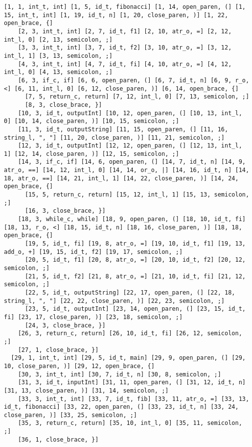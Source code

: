 \documentclass[12pt, a4paper]{memoir}
\begin{document}
\begin{lstlisting}[style=result]
  [1, 1, int_t, int] [1, 5, id_t, fibonacci] [1, 14, open_paren, (] [1, 15, int_t, int] [1, 19, id_t, n] [1, 20, close_paren, )] [1, 22, open_brace, {]
    [2, 3, int_t, int] [2, 7, id_t, f1] [2, 10, atr_o, =] [2, 12, int_l, 0] [2, 13, semicolon, ;]
    [3, 3, int_t, int] [3, 7, id_t, f2] [3, 10, atr_o, =] [3, 12, int_l, 1] [3, 13, semicolon, ;]
    [4, 3, int_t, int] [4, 7, id_t, fi] [4, 10, atr_o, =] [4, 12, int_l, 0] [4, 13, semicolon, ;]
    [6, 3, if_c, if] [6, 6, open_paren, (] [6, 7, id_t, n] [6, 9, r_o, <] [6, 11, int_l, 0] [6, 12, close_paren, )] [6, 14, open_brace, {]
      [7, 5, return_c, return] [7, 12, int_l, 0] [7, 13, semicolon, ;]
      [8, 3, close_brace, }]
    [10, 3, id_t, outputInt] [10, 12, open_paren, (] [10, 13, int_l, 0] [10, 14, close_paren, )] [10, 15, semicolon, ;]
    [11, 3, id_t, outputString] [11, 15, open_paren, (] [11, 16, string_l, ", "] [11, 20, close_paren, )] [11, 21, semicolon, ;]
    [12, 3, id_t, outputInt] [12, 12, open_paren, (] [12, 13, int_l, 1] [12, 14, close_paren, )] [12, 15, semicolon, ;]
    [14, 3, if_c, if] [14, 6, open_paren, (] [14, 7, id_t, n] [14, 9, atr_o, ==] [14, 12, int_l, 0] [14, 14, or_o, |] [14, 16, id_t, n] [14, 18, atr_o, ==] [14, 21, int_l, 1] [14, 22, close_paren, )] [14, 24, open_brace, {]
      [15, 5, return_c, return] [15, 12, int_l, 1] [15, 13, semicolon, ;]
      [16, 3, close_brace, }]
    [18, 3, while_c, while] [18, 9, open_paren, (] [18, 10, id_t, fi] [18, 13, r_o, <] [18, 15, id_t, n] [18, 16, close_paren, )] [18, 18, open_brace, {]
      [19, 5, id_t, fi] [19, 8, atr_o, =] [19, 10, id_t, f1] [19, 13, add_o, +] [19, 15, id_t, f2] [19, 17, semicolon, ;]
      [20, 5, id_t, f1] [20, 8, atr_o, =] [20, 10, id_t, f2] [20, 12, semicolon, ;]
      [21, 5, id_t, f2] [21, 8, atr_o, =] [21, 10, id_t, fi] [21, 12, semicolon, ;]
      [22, 5, id_t, outputString] [22, 17, open_paren, (] [22, 18, string_l, ", "] [22, 22, close_paren, )] [22, 23, semicolon, ;]
      [23, 5, id_t, outputInt] [23, 14, open_paren, (] [23, 15, id_t, fi] [23, 17, close_paren, )] [23, 18, semicolon, ;]
      [24, 3, close_brace, }]
    [26, 3, return_c, return] [26, 10, id_t, fi] [26, 12, semicolon, ;]
    [27, 1, close_brace, }]
  [29, 1, int_t, int] [29, 5, id_t, main] [29, 9, open_paren, (] [29, 10, close_paren, )] [29, 12, open_brace, {]
    [30, 3, int_t, int] [30, 7, id_t, n] [30, 8, semicolon, ;]
    [31, 3, id_t, inputInt] [31, 11, open_paren, (] [31, 12, id_t, n] [31, 13, close_paren, )] [31, 14, semicolon, ;]
    [33, 3, int_t, int] [33, 7, id_t, fib] [33, 11, atr_o, =] [33, 13, id_t, fibonacci] [33, 22, open_paren, (] [33, 23, id_t, n] [33, 24, close_paren, )] [33, 25, semicolon, ;]
    [35, 3, return_c, return] [35, 10, int_l, 0] [35, 11, semicolon, ;]
    [36, 1, close_brace, }]
\end{lstlisting}
\end{document}
